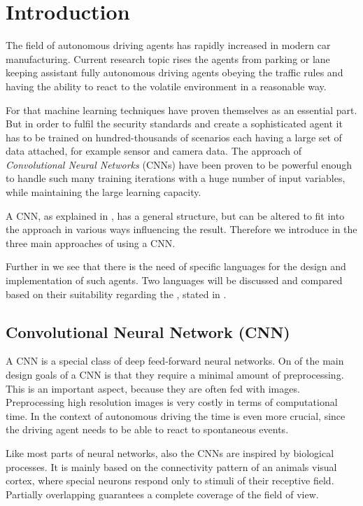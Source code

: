 \chapter{Introduction}

The field of autonomous driving agents has rapidly increased in modern car manufacturing. Current research topic rises the agents from parking or lane keeping assistant fully autonomous driving agents obeying the traffic rules and having the ability to react to the volatile environment in a reasonable way.

For that machine learning techniques have proven themselves as an essential part. But in order to fulfil the security standards and create a sophisticated agent it has to be trained on hundred-thousands of scenarios each having a large set of data attached, for example sensor and camera data.
The approach of \textit{Convolutional Neural Networks} (CNNs) have been proven to be powerful enough to handle such many training iterations with a huge number of input variables, while maintaining the large learning capacity. \cite{krizhevsky2012imagenet}

A CNN, as explained in , has a general structure, but can be altered to fit into the approach in various ways influencing the result. Therefore we introduce in  the three main approaches of using a CNN.

Further in  we see that there is the need of specific languages for the design and implementation of such agents. Two languages will be discussed and compared based on their suitability regarding the \alexnet, stated in  .

\section{Convolutional Neural Network (CNN)}\label{sec:CNN}

A CNN is a special class of deep feed-forward neural networks. On of the main design goals of a CNN is that they require a minimal amount of preprocessing. This is an important aspect, because they are often fed with images. Preprocessing high resolution images is very costly in terms of computational time. In the context of autonomous driving the time is even more crucial, since the driving agent needs to be able to react to spontaneous events.

Like most parts of neural networks, also the CNNs are inspired by biological processes. It is mainly based on the connectivity pattern of an animals visual cortex, where special neurons respond only to stimuli of their receptive field. Partially overlapping guarantees a complete coverage of the field of view. \cite{wiki:CNN}

